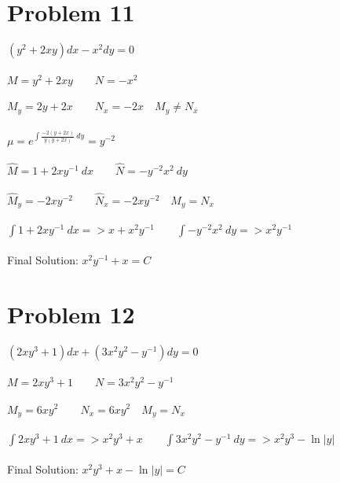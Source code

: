 \documentclass[12pt]{exam}
\begin{document}
\section*{Problem 11}
$(y^2+2xy)dx-x^2dy=0$\\\\
$M=y^2+2xy\qquad N=-x^2$\\\\
$M_y=2y+2x\qquad N_x=-2x\quad M_y\neq N_x$\\\\
$\mu=e^{\int\frac{-2(y+2x)}{y(y+2x)}\:dy}=y^{-2}$\\\\
$\hat{M}=1+2xy^{-1}\:dx\qquad \hat{N}=-y^{-2}x^2\:dy$\\\\
$\hat{M}_y=-2xy^{-2}\qquad \hat{N}_x=-2xy^{-2}\quad M_y=N_x$\\\\
$\int1+2xy^{-1}\:dx=>x+x^2y^{-1}\qquad\int-y^{-2}x^2\:dy=>x^2y^{-1}$\\\\
Final Solution: $x^2y^{-1}+x=C$
\section*{Problem 12}
$(2xy^3+1)dx+(3x^2y^2-y^{-1})dy=0$\\\\
$M=2xy^3+1\qquad N=3x^2y^2-y^{-1}$\\\\
$M_y=6xy^2\qquad N_x=6xy^2\quad M_y=N_x$\\\\
$\int2xy^3+1\:dx=>x^2y^3+x\qquad\int3x^2y^2-y^{-1}\:dy=>x^2y^3-\ln{|y|}$\\\\
Final Solution: $x^2y^3+x-\ln{|y|}=C$
\end{document}
